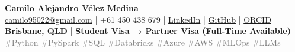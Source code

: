 \begin{center}
    {\LARGE \textbf{Camilo Alejandro Vélez Medina}} \\
    \vspace{0.3em}
    \href{mailto:camilo95022@gmail.com}{camilo95022@gmail.com} \quad | \quad
    +61 450 438 679 \quad | \quad
    \href{https://www.linkedin.com/in/camilo-alejandro-v%C3%A9lez-medina-1b447a144}{LinkedIn} \quad | \quad
    \href{https://github.com/Camilovelez1}{GitHub} \quad | \quad
    \href{https://orcid.org/0009-0000-8515-2545}{ORCID} \\
    \vspace{0.2em}
    \textbf{Brisbane, QLD} \quad | \quad \textbf{Student Visa → Partner Visa (Full-Time Available)} \\
    \vspace{0.5em}
    \small
    \textcolor{gray}{
        \#Python \quad \#PySpark \quad \#SQL \quad \#Databricks \quad \#Azure \quad \#AWS \quad \#MLOps \quad \#LLMs
    }
\end{center}
